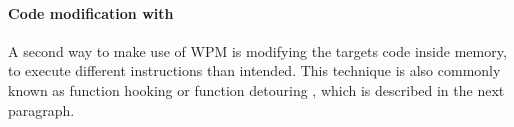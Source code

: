 \paragraph{Code modification with }
A second way to make use of \gls{WPM} is modifying the targets code inside memory, to execute different instructions than intended. This technique is also commonly known as function hooking or function detouring \cite{codeproject_hooking}, which is described in the next paragraph. 